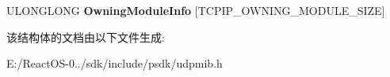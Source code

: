 \begin{DoxyCompactItemize}
\begin{tabbing}
\end{tabbing}\item 
\mbox{\label{struct___m_i_b___u_d_p_r_o_w___o_w_n_e_r___m_o_d_u_l_e_a6a4146e842c603adb3fe632a70015064}} 
U\+L\+O\+N\+G\+L\+O\+NG {\bfseries Owning\+Module\+Info} \mbox{[}T\+C\+P\+I\+P\+\_\+\+O\+W\+N\+I\+N\+G\+\_\+\+M\+O\+D\+U\+L\+E\+\_\+\+S\+I\+ZE\mbox{]}
\end{DoxyCompactItemize}


该结构体的文档由以下文件生成\+:\begin{DoxyCompactItemize}
\item 
E\+:/\+React\+O\+S-\/0../sdk/include/psdk/udpmib.\+h\end{DoxyCompactItemize}
